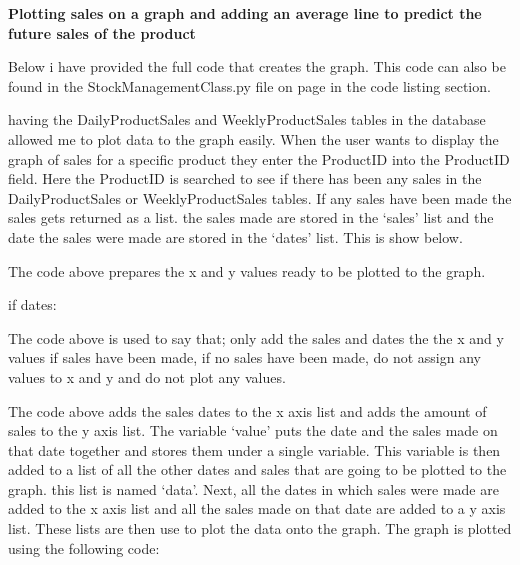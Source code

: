 
\textbf{Plotting sales on a graph and adding an average line to predict the future sales of the product}

Below i have provided the full code that creates the graph. This code can also be found in the StockManagementClass.py file on page \pageref{fig:StockManagementClass} in the code listing section.


having the DailyProductSales and WeeklyProductSales tables in the database allowed me to plot data to the graph easily. When the user wants to display the graph of sales for a specific product they enter the ProductID into the ProductID field. Here the ProductID is searched to see if there has been any sales in the DailyProductSales or WeeklyProductSales tables. If any sales have been made the sales gets returned as a list. the sales made are stored in the `sales' list and the date the sales were made are stored in the `dates' list. This is show below.


\pagebreak


The code above prepares the x and y values ready to be plotted to the graph.

\begin{python}
if dates:
\end{python}

The code above is used to say that; only add the sales and dates the the x and y values if sales have been made, if no sales have been made, do not assign any values to x and y and do not plot any values.


The code above adds the sales dates to the x axis list and adds the amount of sales to the y axis list. The variable `value' puts the date and the sales made on that date together and stores them under a single variable. This variable is then added to a list of all the other dates and sales that are going to be plotted to the graph. this list is named `data'. Next, all the dates in which sales were made are added to the x axis list and all the sales made on that date are added to a y axis list. These lists are then use to plot the data onto the graph. The graph is plotted using the following code:

